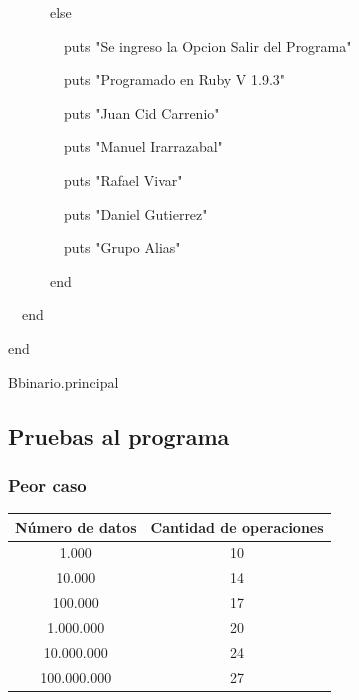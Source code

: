 {\bigskip 
\noindent \ \ \ \ \ \       else 

\noindent \ \ \ \ \ \ \ \         puts "Se ingreso la Opcion Salir del Programa"

\noindent \ \ \ \ \ \ \ \         puts "Programado en Ruby V 1.9.3"

\noindent \ \ \ \ \ \ \ \         puts "Juan Cid Carrenio"

\noindent \ \ \ \ \ \ \ \         puts "Manuel Irarrazabal"

\noindent \ \ \ \ \ \ \ \         puts "Rafael Vivar"

\noindent \ \ \ \ \ \ \ \         puts "Daniel Gutierrez"

\noindent \ \ \ \ \ \ \ \         puts "Grupo Alias"

\noindent \ \ \ \ \ \       end

\noindent \ \   end

\bigskip 
\noindent end

\bigskip 
\noindent Bbinario.principal



}


\subsection{Pruebas al programa}

\subsubsection{Peor caso}

\begin{center}
\begin{tabular}{|c|c|}
\hline
\cellcolor[gray]{0.85} \textbf{Número de datos} & 	\cellcolor[gray]{0.85} \textbf{Cantidad de operaciones}\\

\hline
1.000		&	10\\
\hline
10.000	&	14  \\
\hline
100.000	&	17  \\
\hline
1.000.000	&	20  \\
\hline
10.000.000	&	24  \\
\hline
100.000.000	&	27  \\
\hline
\end{tabular}
\end{center}

